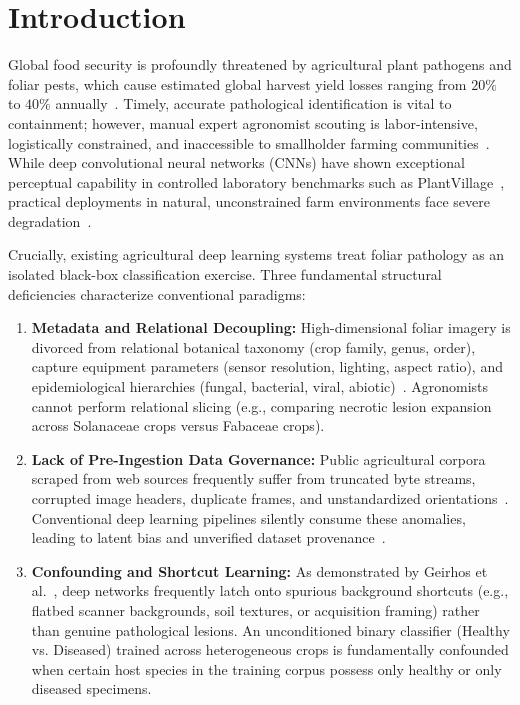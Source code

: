 \documentclass[conference]{IEEEtran}
\begin{document}
\section{Introduction}
Global food security is profoundly threatened by agricultural plant pathogens and foliar pests, which cause estimated global harvest yield losses ranging from $20\%$ to $40\%$ annually~\cite{barbedo2018impact}. Timely, accurate pathological identification is vital to containment; however, manual expert agronomist scouting is labor-intensive, logistically constrained, and inaccessible to smallholder farming communities~\cite{mohanty2016deep}. While deep convolutional neural networks (CNNs) have shown exceptional perceptual capability in controlled laboratory benchmarks such as PlantVillage~\cite{hughes2015plantvillage, ferentinos2018deep}, practical deployments in natural, unconstrained farm environments face severe degradation~\cite{singh2020plantdoc, too2019comparative}. 

Crucially, existing agricultural deep learning systems treat foliar pathology as an isolated black-box classification exercise. Three fundamental structural deficiencies characterize conventional paradigms:
\begin{enumerate}
    \item \textbf{Metadata and Relational Decoupling:} High-dimensional foliar imagery is divorced from relational botanical taxonomy (crop family, genus, order), capture equipment parameters (sensor resolution, lighting, aspect ratio), and epidemiological hierarchies (fungal, bacterial, viral, abiotic)~\cite{kimball2013datawarehouse}. Agronomists cannot perform relational slicing (e.g., comparing necrotic lesion expansion across Solanaceae crops versus Fabaceae crops).
    \item \textbf{Lack of Pre-Ingestion Data Governance:} Public agricultural corpora scraped from web sources frequently suffer from truncated byte streams, corrupted image headers, duplicate frames, and unstandardized orientations~\cite{singh2020plantdoc}. Conventional deep learning pipelines silently consume these anomalies, leading to latent bias and unverified dataset provenance~\cite{torralba2011unbiased}.
    \item \textbf{Confounding and Shortcut Learning:} As demonstrated by Geirhos et al.~\cite{geirhos2020shortcut}, deep networks frequently latch onto spurious background shortcuts (e.g., flatbed scanner backgrounds, soil textures, or acquisition framing) rather than genuine pathological lesions. An unconditioned binary classifier (Healthy vs. Diseased) trained across heterogeneous crops is fundamentally confounded when certain host species in the training corpus possess only healthy or only diseased specimens.
\end{enumerate}
\end{document}
